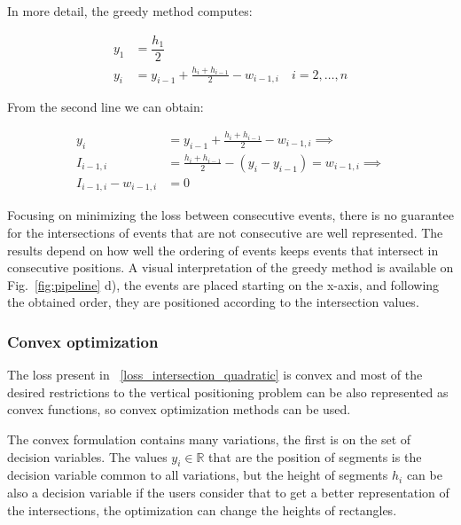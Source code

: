 %
In more detail, the greedy method computes:

\begin{equation}
    \begin{split}
        y_1 &= \dfrac{h_1}{2} \\
        y_i &= y_{i -1} + \frac{h_i + h_{i-1}}{2} - w_{i-1, i} \quad i = 2, \dots, n   
    \end{split}
\end{equation}

From the second line we can obtain:

\begin{equation}
\begin{split}
     y_i &= y_{i -1} + \frac{h_i + h_{i-1}}{2} - w_{i-1, i} \implies \\
     I_{i-1,i} &= \frac{h_i + h_{i-1}}{2} - (y_i - y_{i -1})  = w_{i-1, i}  \implies \\
     I_{i-1,i} - w_{i-1, i}  &= 0
\end{split}
\end{equation}

Focusing on minimizing the loss between consecutive events, there is no guarantee for the intersections of events that are not consecutive are well represented.
%
The results depend on how well the ordering of events keeps events that intersect in consecutive positions.
%
A visual interpretation of the greedy method is available on Fig.~\ref{fig:pipeline} d), the events are placed starting on the x-axis, and following the obtained order, they are positioned according to the intersection values. 

\subsubsection{Convex optimization}

The loss present in ~\ref{loss_intersection_quadratic} is convex and most of the desired restrictions to the vertical positioning problem can be also represented  as convex functions, so convex optimization methods can be used.
%

The convex formulation contains many variations, the first is on the set of decision variables.
%
The values $y_{i} \in \mathbb{R}$ that are the position of segments is the decision variable common to all variations, 
%
but the height of segments $h_i$ can be also a decision variable if the users consider that to get a better representation of the intersections, the optimization can change the heights of rectangles.
%

